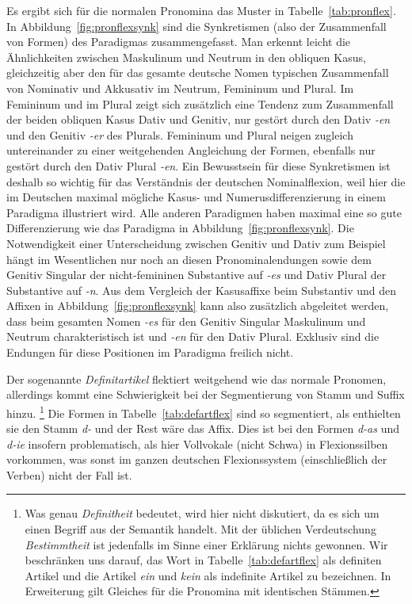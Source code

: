 Es ergibt sich für die normalen Pronomina das Muster in Tabelle~\ref{tab:pronflex}.
In Abbildung~\ref{fig:pronflexsynk} sind die Synkretismen (also der Zusammenfall von Formen) des Paradigmas zusammengefasst.
Man erkennt leicht die Ähnlichkeiten zwischen Maskulinum und Neutrum in den obliquen Kasus, gleichzeitig aber den für das gesamte deutsche Nomen typischen Zusammenfall von Nominativ und Akkusativ im Neutrum, Femininum und Plural.
Im Femininum und im Plural zeigt sich zusätzlich eine Tendenz zum Zusammenfall der beiden obliquen Kasus Dativ und Genitiv, nur gestört durch den Dativ \textit{-en} und den Genitiv \textit{-er} des Plurals.
Femininum und Plural neigen zugleich untereinander zu einer weitgehenden Angleichung der Formen, ebenfalls nur gestört durch den Dativ Plural \textit{-en}.
Ein Bewusstsein für diese Synkretismen ist deshalb so wichtig für das Verständnis der deutschen Nominalflexion, weil hier die im Deutschen maximal mögliche Kasus- und Numerusdifferenzierung in einem Paradigma illustriert wird.
Alle anderen Paradigmen haben maximal eine so gute Differenzierung wie das Paradigma in Abbildung~\ref{fig:pronflexsynk}.
Die Notwendigkeit einer Unterscheidung zwischen Genitiv und Dativ zum Beispiel hängt im Wesentlichen nur noch an diesen Pronominalendungen sowie dem Genitiv Singular der nicht-femininen Substantive auf \textit{-es} und Dativ Plural der Substantive auf \textit{-n}.
Aus dem Vergleich der Kasusaffixe beim Substantiv und den Affixen in Abbildung~\ref{fig:pronflexsynk} kann also zusätzlich abgeleitet werden, dass beim gesamten Nomen \textit{-es} für den Genitiv Singular Maskulinum und Neutrum charakteristisch ist und \textit{-en} für den Dativ Plural.
Exklusiv sind die Endungen für diese Positionen im Paradigma freilich nicht.


Der sogenannte \textit{Definitartikel} flektiert weitgehend wie das normale Pronomen, allerdings kommt eine Schwierigkeit bei der Segmentierung von Stamm und Suffix hinzu.%
\footnote{Was genau \textit{Definitheit} bedeutet, wird hier nicht diskutiert, da es sich um einen Begriff aus der Semantik handelt.
Mit der üblichen Verdeutschung \textit{Bestimmtheit} ist jedenfalls im Sinne einer Erklärung nichts gewonnen.
Wir beschränken uns darauf, das Wort in Tabelle~\ref{tab:defartflex} als definiten Artikel und die Artikel \textit{ein} und \textit{kein} als indefinite Artikel zu bezeichnen.
In Erweiterung gilt Gleiches für die Pronomina mit identischen Stämmen.}
Die Formen in Tabelle~\ref{tab:defartflex} sind so segmentiert, als enthielten sie den Stamm \textit{d-} und der Rest wäre das Affix.
Dies ist bei den Formen \textit{d-as} und \textit{d-ie} insofern problematisch, als hier Vollvokale (nicht Schwa) in Flexionssilben vorkommen, was sonst im ganzen deutschen Flexionssystem (einschließlich der Verben) nicht der Fall ist.

